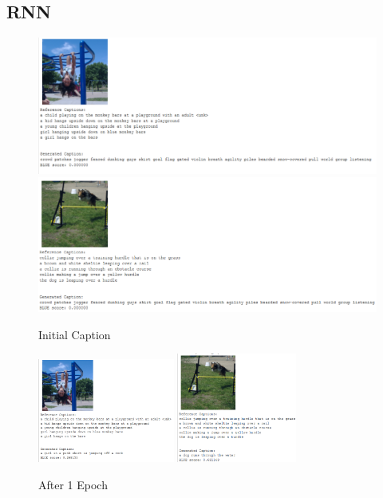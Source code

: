 \documentclass{article}
\begin{document}
    \subsection{RNN}
    \begin{figure}[H]
        \centering
        \includegraphics[width=1\textwidth]{rnn_girl_epoch_0.PNG}
        \includegraphics[width=1\textwidth]{rnn_dog_epoch_0.PNG}
        \caption{Initial Caption}
    \end{figure}

    \begin{figure}[H]
        \centering
        \includegraphics[width=0.4\textwidth]{rnn_girl_epoch_1.PNG}
        \includegraphics[width=0.35\textwidth]{rnn_dog_epoch_1.PNG}
        \caption{After 1 Epoch}
    \end{figure}
\end{document}

